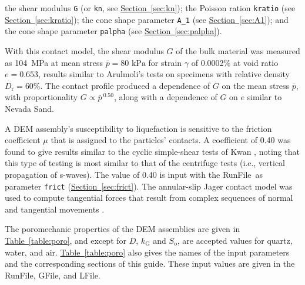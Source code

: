 \documentclass[letterpaper,11pt]{article}
\newcommand{\RunFile}{\textsf{RunFile}}
\newcommand{\GFile}{\textsf{GFile}}
\newcommand{\LFile}{\textsf{LFile}}
\begin{document}
the shear modulus \texttt{G}
(or \texttt{kn}, see \hyperref[sec:kn]{Section~\ref*{sec:kn}});
the Poisson ration \texttt{kratio}
(see \hyperref[sec:kratio]{Section~\ref*{sec:kratio}});
the cone shape parameter \texttt{A\_1}
(see \hyperref[sec:A1]{Section~\ref*{sec:A1}});
and the cone shape parameter \texttt{palpha}
(see \hyperref[sec:palpha]{Section~\ref*{sec:palpha}}).
\par
With this contact model, the shear modulus $G$
of the bulk material
was measured as 104~MPa at mean stress $\bar{p}=\text{80~kPa}$
for strain $\gamma$ of 0.0002\% at
void ratio $e=\text{0.653}$,
results similar to Arulmoli's tests on specimens with
relative density $D_{\text{r}}=\text{60\%}$.
The contact profile produced a dependence of $G$
on the mean stress $\bar{p}$,
with proportionality $G\propto \bar{p}^{\:\text{0.50}}$,
along with a dependence of $G$ on $e$ similar to
Nevada Sand.
%
\par
A DEM assembly's susceptibility to liquefaction 
is sensitive to the friction coefficient $\mu$ that is assigned
to the particles' contacts.
A coefficient of 0.40 was found to give results similar to
the cyclic simple-shear tests of Kwan \cite{Kwan:2015a},
noting that this type of testing is most similar to that
of the centrifuge tests (i.e., vertical propagation of s-waves).
The value of 0.40 is input with the \RunFile\ as
parameter \texttt{frict}
(\hyperref[sec:frict]{Section~\ref*{sec:frict}}).
The annular-slip Jager contact model was used
to compute tangential forces that result from complex
sequences of normal and tangential movements \cite{Kuhn:2011a}.
%
\par
The poromechanic properties of the DEM assemblies
are given in
\hyperref[table:poro]{Table~\ref*{table:poro}},
and except for
$D$, $k_{\text{G}}$ and $S_{\text{o}}$,
are accepted values for quartz, water, and air.
\hyperref[table:poro]{Table~\ref*{table:poro}} also gives
the names of the input parameters and the corresponding
sections of this guide.
These input values are given in the 
\RunFile, \GFile, and \LFile.
%
\end{document}
